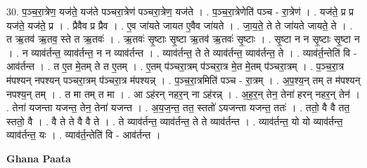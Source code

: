 \documentclass[17pt]{extarticle}
\begin{document}
30. प॒ञ्च॒रा॒त्रेण॒ यज॑ते॒ यज॑ते पञ्चरा॒त्रेण॑ पञ्चरा॒त्रेण॒ यज॑ते । . प॒ञ्च॒रा॒त्रेणेति॑ पञ्च - रा॒त्रेण॑ । . यज॑ते॒ प्र प्र यज॑ते॒ यज॑ते॒ प्र । . प्रैवैव प्र प्रैव । . ए॒व जा॑यते जायत ए॒वैव जा॑यते । . जा॒य॒ते॒ ते ते जा॑यते जायते॒ ते । . त ऋ॒तव॑ ऋ॒तव॒ स्ते त ऋ॒तवः॑ । . ऋ॒तवः॑ सृ॒ष्टाः सृ॒ष्टा ऋ॒तव॑ ऋ॒तवः॑ सृ॒ष्टाः । . सृ॒ष्टा न न सृ॒ष्टाः सृ॒ष्टा न । . न व्याव॑र्तन्त॒ व्याव॑र्तन्त॒ न न व्याव॑र्तन्त । . व्याव॑र्तन्त॒ ते ते व्याव॑र्तन्त॒ व्याव॑र्तन्त॒ ते । . व्याव॑र्त॒न्तेति॑ वि - आव॑र्तन्त । . त ए॒त मे॒तम् ते त ए॒तम् । . ए॒तम् प॑ञ्चरा॒त्रम् प॑ञ्चरा॒त्र मे॒त मे॒तम् प॑ञ्चरा॒त्रम् । . प॒ञ्च॒रा॒त्र म॑पश्यन् नपश्यन् पञ्चरा॒त्रम् प॑ञ्चरा॒त्र म॑पश्यन्न् । . प॒ञ्च॒रा॒त्रमिति॑ पञ्च - रा॒त्रम् । . अ॒प॒श्य॒न् तम् त म॑पश्यन् नपश्य॒न् तम् । . त मा तम् त मा । . आ ऽह॑रन् नहर॒न् ना ऽह॑रन्न् । . अ॒ह॒र॒न् तेन॒ तेना॑ हरन् नहर॒न् तेन॑ । . तेना॑ यजन्ता यजन्त॒ तेन॒ तेना॑ यजन्त । . अ॒य॒ज॒न्त॒ तत॒ स्ततो॑ ऽयजन्ता यजन्त॒ ततः॑ । . ततो॒ वै वै तत॒ स्ततो॒ वै । . वै ते ते वै वै ते । . ते व्याव॑र्तन्त॒ व्याव॑र्तन्त॒ ते ते व्याव॑र्तन्त । . व्याव॑र्तन्त॒ यो यो व्याव॑र्तन्त॒ व्याव॑र्तन्त॒ यः । . व्याव॑र्त॒न्तेति॑ वि - आव॑र्तन्त । \newline

\textbf{Ghana Paata } \newline
\end{document}
